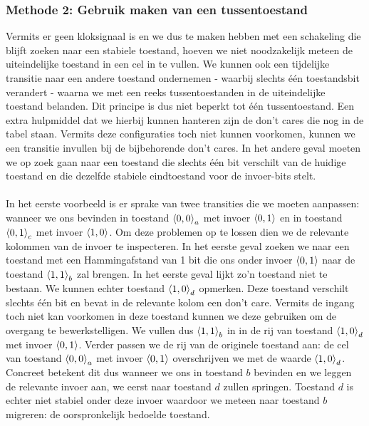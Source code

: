 \subsubsection{Methode 2: Gebruik maken van een tussentoestand}
Vermits er geen kloksignaal is en we dus te maken hebben met een schakeling die blijft zoeken naar een stabiele toestand, hoeven we niet noodzakelijk meteen de uiteindelijke toestand in een cel in te vullen. We kunnen ook een tijdelijke transitie naar een andere toestand ondernemen - waarbij slechts \'e\'en toestandsbit verandert - waarna we met een reeks tussentoestanden in de uiteindelijke toestand belanden. Dit principe is dus niet beperkt tot \'e\'en tussentoestand. Een extra hulpmiddel dat we hierbij kunnen hanteren zijn de don't cares die nog in de tabel staan. Vermits deze configuraties toch niet kunnen voorkomen, kunnen we een transitie invullen bij de bijbehorende don't cares. In het andere geval moeten we op zoek gaan naar een toestand die slechts \'e\'en bit verschilt van de huidige toestand en die dezelfde stabiele eindtoestand voor de invoer-bits stelt.
\paragraph{}
In het eerste voorbeeld is er sprake van twee transities die we moeten aanpassen: wanneer we ons bevinden in toestand $\left\langle 0,0 \right\rangle_a$ met invoer $\left\langle 0,1 \right\rangle$ en in toestand $\left\langle 0,1 \right\rangle_c$ met invoer $\left\langle 1,0 \right\rangle$. Om deze problemen op te lossen dien we de relevante kolommen van de invoer te inspecteren. In het eerste geval zoeken we naar een toestand met een Hammingafstand van 1 bit die ons onder invoer $\left\langle 0,1 \right\rangle$ naar de toestand $\left\langle 1,1 \right\rangle_b$ zal brengen. In het eerste geval lijkt zo'n toestand niet te bestaan. We kunnen echter toestand $\left\langle 1,0 \right\rangle_d$ opmerken. Deze toestand verschilt slechts \'e\'en bit en bevat in de relevante kolom een don't care. Vermits de ingang toch niet kan voorkomen in deze toestand kunnen we deze gebruiken om de overgang te bewerkstelligen. We vullen dus $\left\langle 1,1 \right\rangle_b$ in in de rij van toestand $\left\langle 1,0 \right\rangle_d$ met invoer $\left\langle 0,1 \right\rangle$. Verder passen we de rij van de originele toestand aan: de cel van toestand $\left\langle 0,0 \right\rangle_a$ met invoer $\left\langle 0,1 \right\rangle$ overschrijven we met de waarde $\left\langle 1,0 \right\rangle_d$. Concreet betekent dit dus wanneer we ons in toestand $b$ bevinden en we leggen de relevante invoer aan, we eerst naar toestand $d$ zullen springen. Toestand $d$ is echter niet stabiel onder deze invoer waardoor we meteen naar toestand $b$ migreren: de oorspronkelijk bedoelde toestand.
